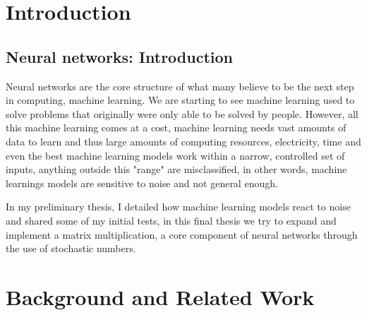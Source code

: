 \documentclass[a4paper,oneside,phd,etd]{BYUPhys}
\begin{document}
 \frontmatter


 \makepreliminarypages


\doublespace
%

%

 \clearemptydoublepage
\singlespace
 \tableofcontents

\clearemptydoublepage
\listoffigures

\clearemptydoublepage

\clearemptydoublepage

\mainmatter
%
\chapter{Introduction}
\label{chap:Introduction}


\section{Neural networks: Introduction}
Neural networks are the core structure of what many believe to be the next step in computing, machine learning. We are starting to see machine learning used to solve problems that originally were only able to be solved by people\cite{bojarski2016end}. However, all this machine learning comes at a cost, machine learning needs vast amounts of data to learn and thus large amounts of computing resources, electricity, time and even the best machine learning models work within a narrow, controlled set of inputs, anything outside this "range" are misclassified, in other words, machine learnings models are sensitive to noise and not general enough.

In my preliminary thesis, I detailed how machine learning models react to noise and shared some of my initial tests, in this final thesis we try to expand and implement a matrix multiplication, a core component of neural networks through the use of stochastic numbers.

\chapter{Background and Related Work}
\label{chap:LitReview}
\end{document}
